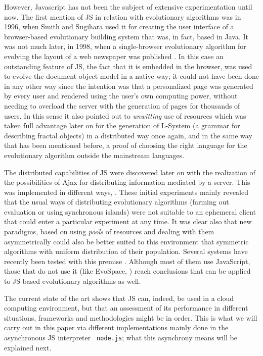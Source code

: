 \documentclass{sig-alternate}
\begin{document}
However, Javascript has not been the subject of extensive
experimentation until now. The first mention of JS in relation
with evolutionary algorithms was in 1996, when Smith and Sugihara
\cite{smith1996ga} used it for creating the user interface of a
browser-based evolutionary building system that was, in fact, based in
Java. It was not much later, in 1998, when a single-browser
evolutionary algorithm for evolving the layout of a web newspaper was
published \cite{jj-ppsn98}. In this case an outstanding feature of
JS, the fact that it is embedded in the browser, was used to
evolve the document object model in a native way; it could not have
been done in any other way since the intention was that a personalized
page was generated by every user and rendered using the user's own
computing power, without needing to overload the server with the
generation of pages for thousands of users. In this sense it also
pointed out to {\em unwitting} \cite{klein2007unwitting} use of resources which was taken full
advantage later on for the generation of L-System (a grammar for
describing fractal objects) in a distributed way
\cite{langdon2004global} once again, and in the same way that has been
mentioned before, a proof of choosing the right language for the
evolutionary algorithm outside the mainstream languages.

The distributed capabilities of JS were discovered later on
with the realization of the possibilities of Ajax for distributing
information mediated by a server. This was implemented in different
ways, \cite{gecco07:workshop:dcor,klein2007unwitting,agajaj}. These
initial experiments mainly revealed that the usual ways of
distributing evolutionary algorithms (farming out evaluation or using
synchronous islands) were not suitable to an ephemeral client that
could enter a particular experiment at any time. It was clear also
that new paradigms, based on using {\em pools} of resources and
dealing with them asymmetrically could also be better suited to this
environment that symmetric algorithms with uniform distribution of their
population. Several systems have recently been
tested with this premise
\cite{DBLP:conf/evoW/ValdezTVGO13,sofea:cec2012}. Although most of
them use JavaScript, those that do not use it (like EvoSpace,
\cite{DBLP:conf/evoW/ValdezTVGO13}) reach conclusions that can be
applied to JS-based evolutionary algorithms as well.

The current state of the art shows that JS can, indeed, be used in a
cloud computing environment, but that an assessment of its performance
in different situations, frameworks and methodologies might be in
order. This is what we will carry out in this paper via different
implementations mainly done in the asynchronous JS interpreter {\tt
  node.js}; what this asynchrony means will be explained next. 
\end{document}
